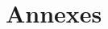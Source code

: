 \documentclass[10pt]{article}
\begin{document}
\pagestyle{fancy}




\begin{multicols}{2}








\end{multicols}



%
%
%



\section*{Annexes}
\begin{appendices}



\end{appendices}
\end{document}
